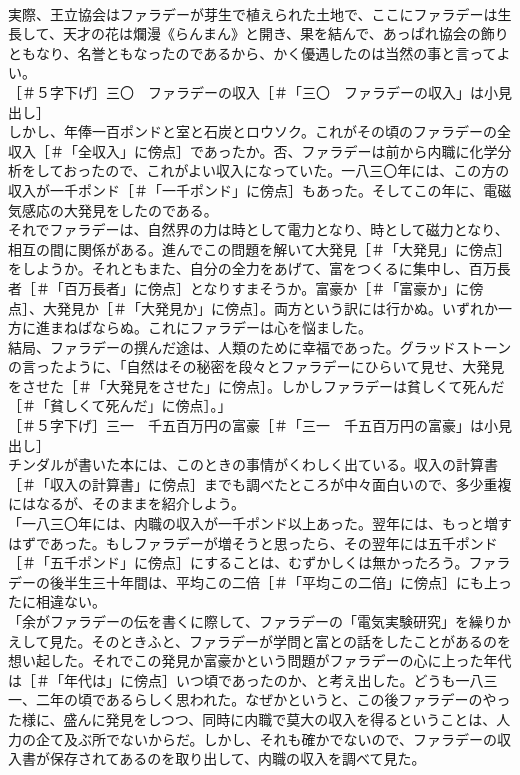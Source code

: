 \documentclass[8pt]{extreport}
\begin{document}
\begin{CJK}{UTF8}{min}
\\	実際、王立協会はファラデーが芽生で植えられた土地で、ここにファラデーは生長して、天才の花は爛漫《らんまん》と開き、果を結んで、あっぱれ協会の飾りともなり、名誉ともなったのであるから、かく優遇したのは当然の事と言ってよい。
\\	［＃５字下げ］三〇　ファラデーの収入［＃「三〇　ファラデーの収入」は小見出し］
\\	しかし、年俸一百ポンドと室と石炭とロウソク。これがその頃のファラデーの全収入［＃「全収入」に傍点］であったか。否、ファラデーは前から内職に化学分析をしておったので、これがよい収入になっていた。一八三〇年には、この方の収入が一千ポンド［＃「一千ポンド」に傍点］もあった。そしてこの年に、電磁気感応の大発見をしたのである。
\\	それでファラデーは、自然界の力は時として電力となり、時として磁力となり、相互の間に関係がある。進んでこの問題を解いて大発見［＃「大発見」に傍点］をしようか。それともまた、自分の全力をあげて、富をつくるに集中し、百万長者［＃「百万長者」に傍点］となりすまそうか。富豪か［＃「富豪か」に傍点］、大発見か［＃「大発見か」に傍点］。両方という訳には行かぬ。いずれか一方に進まねばならぬ。これにファラデーは心を悩ました。
\\	結局、ファラデーの撰んだ途は、人類のために幸福であった。グラッドストーンの言ったように、「自然はその秘密を段々とファラデーにひらいて見せ、大発見をさせた［＃「大発見をさせた」に傍点］。しかしファラデーは貧しくて死んだ［＃「貧しくて死んだ」に傍点］。」
\\	［＃５字下げ］三一　千五百万円の富豪［＃「三一　千五百万円の富豪」は小見出し］
\\	チンダルが書いた本には、このときの事情がくわしく出ている。収入の計算書［＃「収入の計算書」に傍点］までも調べたところが中々面白いので、多少重複にはなるが、そのままを紹介しよう。
\\	「一八三〇年には、内職の収入が一千ポンド以上あった。翌年には、もっと増すはずであった。もしファラデーが増そうと思ったら、その翌年には五千ポンド［＃「五千ポンド」に傍点］にすることは、むずかしくは無かったろう。ファラデーの後半生三十年間は、平均この二倍［＃「平均この二倍」に傍点］にも上ったに相違ない。
\\	「余がファラデーの伝を書くに際して、ファラデーの「電気実験研究」を繰りかえして見た。そのときふと、ファラデーが学問と富との話をしたことがあるのを想い起した。それでこの発見か富豪かという問題がファラデーの心に上った年代は［＃「年代は」に傍点］いつ頃であったのか、と考え出した。どうも一八三一、二年の頃であるらしく思われた。なぜかというと、この後ファラデーのやった様に、盛んに発見をしつつ、同時に内職で莫大の収入を得るということは、人力の企て及ぶ所でないからだ。しかし、それも確かでないので、ファラデーの収入書が保存されてあるのを取り出して、内職の収入を調べて見た。

\end{CJK}
\end{document}
